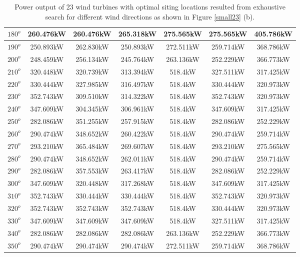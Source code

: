 \begin{table}[H]
\begin{tabular}{|c|c|c|c|c|c|c|}
		$180^o$	& 260.476kW	& 260.476kW	& 265.318kW	& 275.565kW	& 275.565kW	& 405.786kW	\\ \hline
		$190^o$	& 250.893kW	& 262.830kW	& 250.893kW	& 272.511kW	& 259.714kW	& 368.786kW	\\ \hline
		$200^o$	& 248.459kW	& 256.134kW	& 245.764kW	& 263.136kW	& 252.229kW	& 366.773kW	\\ \hline
		$210^o$	& 320.448kW	& 320.739kW	& 313.394kW	& 518.4kW	& 327.511kW	& 317.425kW	\\ \hline
		$220^o$	& 330.444kW	& 327.985kW	& 316.497kW	& 518.4kW	& 330.444kW	& 320.973kW	\\ \hline
		$230^o$	& 352.743kW	& 309.510kW	& 314.322kW	& 518.4kW	& 352.743kW	& 320.973kW	\\ \hline
		$240^o$	& 347.609kW	& 304.345kW	& 306.961kW	& 518.4kW	& 347.609kW	& 317.425kW	\\ \hline
		$250^o$	& 282.086kW	& 351.255kW	& 257.915kW	& 518.4kW	& 282.086kW	& 252.229kW	\\ \hline
		$260^o$	& 290.474kW	& 348.652kW	& 260.422kW	& 518.4kW	& 290.474kW	& 259.714kW	\\ \hline
		$270^o$	& 293.210kW	& 365.484kW	& 269.607kW	& 518.4kW	& 293.210kW	& 275.565kW	\\ \hline
		$280^o$	& 290.474kW	& 348.652kW	& 262.011kW	& 518.4kW	& 290.474kW	& 259.714kW	\\ \hline
		$290^o$	& 282.086kW	& 357.553kW	& 263.417kW	& 518.4kW	& 282.086kW	& 252.229kW	\\ \hline
		$300^o$	& 347.609kW	& 320.448kW	& 317.268kW	& 518.4kW	& 347.609kW	& 317.425kW	\\ \hline
		$310^o$	& 352.743kW	& 330.444kW	& 330.444kW	& 518.4kW	& 352.743kW	& 320.973kW	\\ \hline
		$320^o$	& 352.743kW	& 352.743kW	& 352.743kW	& 518.4kW	& 330.444kW	& 320.973kW	\\ \hline
		$330^o$	& 347.609kW	& 347.609kW	& 347.609kW	& 518.4kW	& 327.511kW	& 317.425kW	\\ \hline
		$340^o$	& 282.086kW	& 282.086kW	& 282.086kW	& 263.136kW	& 252.229kW	& 366.773kW	\\ \hline
		$350^o$	& 290.474kW	& 290.474kW	& 290.474kW	& 272.511kW	& 259.714kW	& 368.786kW	\\ \hline
        	\end{tabular}
        	\caption{Power output of 23 wind turbines with optimal siting locations resulted from exhaustive search for different wind directions as shown in Figure \ref{small23} (b).}
        	\label{table23b}
        \end{table}
